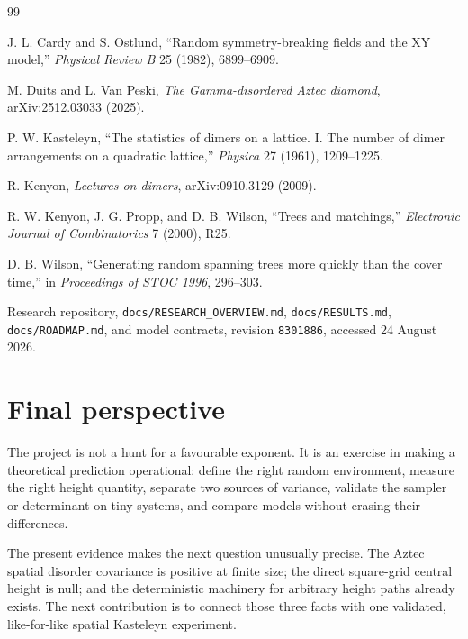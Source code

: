 \documentclass[11pt,a4paper,oneside,openany]{memoir}
\newcommand{\code}[1]{\texttt{#1}}
\newcommand{\1}{\bm{1}}
\begin{document}
\renewcommand{\bibname}{Selected references and project sources}
\begin{thebibliography}{99}

J. L. Cardy and S. Ostlund,
``Random symmetry-breaking fields and the XY model,''
\emph{Physical Review B} 25 (1982), 6899--6909.

M. Duits and L. Van Peski,
\emph{The Gamma-disordered Aztec diamond},
arXiv:2512.03033 (2025).

P. W. Kasteleyn,
``The statistics of dimers on a lattice. I. The number of dimer arrangements on a quadratic lattice,''
\emph{Physica} 27 (1961), 1209--1225.

R. Kenyon,
\emph{Lectures on dimers},
arXiv:0910.3129 (2009).

R. W. Kenyon, J. G. Propp, and D. B. Wilson,
``Trees and matchings,''
\emph{Electronic Journal of Combinatorics} 7 (2000), R25.

D. B. Wilson,
``Generating random spanning trees more quickly than the cover time,''
in \emph{Proceedings of STOC 1996}, 296--303.

Research repository,
\code{docs/RESEARCH\_OVERVIEW.md}, \code{docs/RESULTS.md},
\code{docs/ROADMAP.md}, and model contracts,
revision \code{8301886}, accessed 24 August 2026.

\end{thebibliography}

\backmatter
\chapter*{Final perspective}

The project is not a hunt for a favourable exponent. It is an exercise in
making a theoretical prediction operational: define the right random
environment, measure the right height quantity, separate two sources of
variance, validate the sampler or determinant on tiny systems, and compare
models without erasing their differences.

The present evidence makes the next question unusually precise. The Aztec
spatial disorder covariance is positive at finite size; the direct square-grid
central height is null; and the deterministic machinery for arbitrary height
paths already exists. The next contribution is to connect those three facts
with one validated, like-for-like spatial Kasteleyn experiment.
\end{document}
